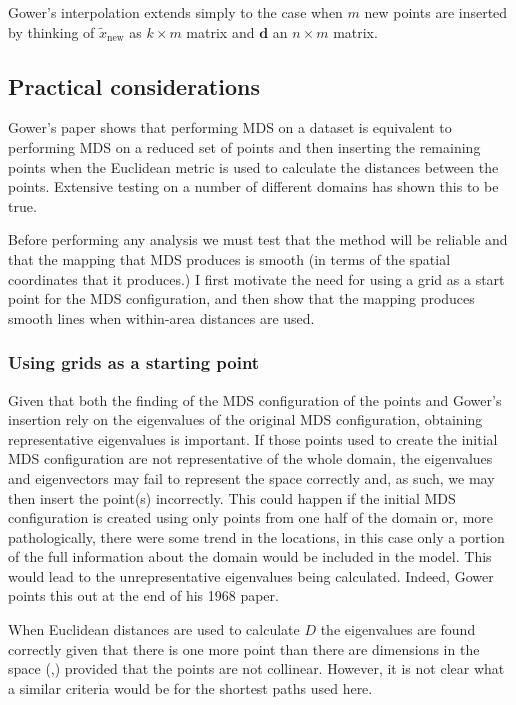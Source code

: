 \documentclass[a4paper,10pt]{article}
\newcommand{\cross}{\times}
\begin{document}
Gower's interpolation extends simply to the case when $m$ new points are inserted by thinking of $\tilde{x}_{\text{new}}$ as $k \cross m$ matrix and $\mathbf{d}$ an $n \cross m$ matrix.


\subsection{Practical considerations}

Gower's paper shows that performing MDS on a dataset is equivalent to performing MDS on a reduced set of points and then inserting the remaining points when the Euclidean metric is used to calculate the distances between the points. Extensive testing on a number of different domains has shown this to be true.

Before performing any analysis we must test that the method will be reliable and that the mapping that MDS produces is smooth (in terms of the spatial coordinates that it produces.) I first motivate the need for using a grid as a start point for the MDS configuration, and then show that the mapping produces smooth lines when within-area distances are used.

\subsubsection{Using grids as a starting point}
\label{grids}
Given that both the finding of the MDS configuration of the points and Gower's insertion rely on the eigenvalues of the original MDS configuration, obtaining representative eigenvalues is important. If those points used to create the initial MDS configuration are not representative of the whole domain, the eigenvalues and eigenvectors may fail to represent the space correctly and, as such, we may then insert the point(s) incorrectly. This could happen if the initial MDS configuration is created using only points from one half of the domain or, more pathologically, there were some trend in the locations, in this case only a portion of the full information about the domain would be included in the model. This would lead to the unrepresentative eigenvalues being calculated. Indeed, Gower points this out at the end of his 1968 paper.

When Euclidean distances are used to calculate $D$ the eigenvalues are found correctly given that there is one more point than there are dimensions in the space (\cite{landmark},) provided that the points are not collinear. However, it is not clear what a similar criteria would be for the shortest paths used here. 
\end{document}
